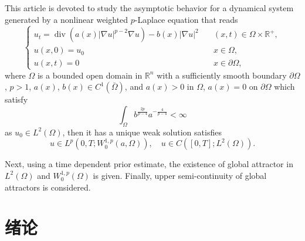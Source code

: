 \documentclass[oneside,longtitle]{LZUthesis}
\numberwithin{equation}{chapter}
\newcommand*\abs[1]{\lvert#1\rvert}
\newcommand\R{\mathbb{R}}
\DeclareMathOperator{\Div}{div}
\begin{document}
\begin{englishabstract}
	This article is devoted to study the asymptotic behavior for a dynamical system generated by a nonlinear
	weighted $p$-Laplace equation that reads
	\begin{equation*}
		\begin{cases}
			u_t = \Div(a(x)\abs{\nabla u}^{p-2}\nabla u) - b(x)\abs{\nabla u}^2 \quad &(x, t) \in \Omega \times \R^+,\\
			u(x,0) = u_0 \quad &x \in \Omega,\\
			u(x, t) = 0 \quad &x \in \partial\Omega,
		\end{cases}
	\end{equation*}
	where $\Omega$ is a bounded open domain in $\R^{n}$ with a sufficiently smooth boundary $\partial\Omega$, $p>1$,
	$ a(x)$, $b(x) \in C^1(\bar{\Omega}) $, 
	and $a(x) > 0$ in $\Omega$, $a(x) = 0$ on $\partial\Omega$ which satisfy
	\begin{equation*}
		\int_{\Omega} b^{\frac{2p}{p-4}}a^{-\frac{4}{p-4}} < \infty
	\end{equation*}
	as $u_0 \in L^2(\Omega) $, then it has a unique weak solution satisfies
	\begin{equation*}
	u \in L^p(0, T; W_0^{1,p}(a,\Omega)), \quad u \in C([0, T]; L^2(\Omega)).
	\end{equation*}

	Next, using a time dependent prior estimate, the existence of global attractor in $L^2(\Omega)$ and $W_0^{1,p}(\Omega)$ is given.
	Finally, upper semi-continuity of global attractors is considered.
\end{englishabstract}


\tableofcontents{}


\mainmatter

\pagestyle{lzu}


\chapter{绪论}
\end{document}
